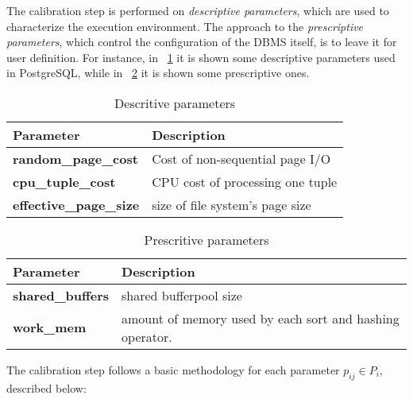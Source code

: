 The calibration step is performed on  \textit{descriptive parameters}, which are used to characterize the execution environment. The approach to the \textit{prescriptive parameters}, which control the configuration of the DBMS itself, is to leave it for user definition. For instance, in ~\ref{table:descritive} it is shown some descriptive parameters used in PostgreSQL, while in ~\ref{table:prescritive} it is shown some prescriptive ones. 


\begin{table}[ht]
    \centering
    \begin{tabular}{ | l | p{5cm} |}
    \hline
    Parameter & Description  \\ \hline
    \textbf{random\_page\_cost} & Cost of non-sequential page I/O \\ \hline
    \textbf{cpu\_tuple\_cost} & CPU cost of processing one tuple \\ \hline
    \textbf{effective\_page\_size} & size of file system's page size  \\
    \hline
    \end{tabular}
    \caption{Descritive parameters}
    \label{table:descritive}
\end{table}


\begin{table}[ht]
    \centering
    \begin{tabular}{ | l | p{5cm} |}
    \hline
      Parameter & Description  \\ \hline
    \textbf{shared\_buffers} & shared bufferpool size \\ \hline
    \textbf{work\_mem} & amount of memory used by each sort and hashing operator. \\
    \hline
    \end{tabular}
    \caption{Prescritive parameters}
    \label{table:prescritive}
\end{table}

The calibration step follows a basic methodology for each parameter $p_{ij} \in P_{i}$, described below:

